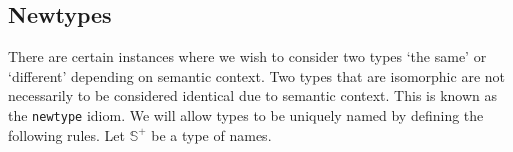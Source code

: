 \documentclass[UKenglish, 11pt, a4paper, parskip=half]{scrbook}
\newcommand{\inlinecode}[1]{\lstinline{#1}}
\begin{document}

\subsection{Newtypes}

There are certain instances where we wish to consider two types `the same' or `different' depending on semantic context.
Two types that are isomorphic are not necessarily to be considered identical due to semantic context.
This is known as the \inlinecode{newtype} idiom.
We will allow types to be uniquely named by defining the following rules.
Let \( \mathbb S^+ \) be a type of names.
\end{document}
